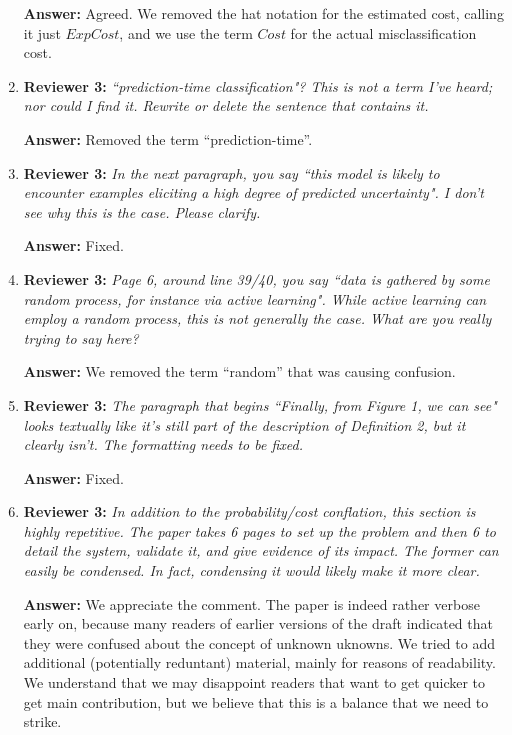\documentclass[letterpaper]{article}
\begin{document}
\begin{enumerate}
\textbf{Answer:} Agreed. We removed the hat notation for the estimated cost, calling it just $\mathit{ExpCost}$, and we use the term $\mathit{Cost}$ for the actual misclassification cost.

\item \textbf{Reviewer 3:} \emph{ ``prediction-time classification"?  This is not a term I've heard; nor could I find it.  Rewrite or delete the sentence that contains it.}

\textbf{Answer:} Removed the term ``prediction-time''.

\item \textbf{Reviewer 3:} \emph{ In the next paragraph, you say ``this model is likely to encounter examples eliciting a high degree of predicted uncertainty".  I don't see why this is the case.  Please clarify.}

\textbf{Answer:} Fixed.

\item \textbf{Reviewer 3:} \emph{ Page 6, around line 39/40, you say ``data is gathered by some random process, for instance via active learning".  While active learning can employ a random process, this is not generally the case.  What are you really trying to say here?}

\textbf{Answer:} We removed the term ``random'' that was causing confusion.

\item \textbf{Reviewer 3:} \emph{ The paragraph that begins ``Finally, from Figure 1, we can see" looks textually like it's still part of the description of Definition 2, but it clearly isn't. The formatting needs to be fixed.}

\textbf{Answer:} Fixed.

\item \textbf{Reviewer 3:} \emph{ In addition to the probability/cost conflation, this section is highly repetitive.  The paper takes 6 pages to set up the problem and then 6 to detail the system, validate it, and give evidence of its impact.  The former can easily be condensed.  In fact, condensing it would likely make it more clear.}

\textbf{Answer:} We appreciate the comment. The paper is indeed rather verbose early on, because many readers of earlier versions of the draft indicated that they were confused about the concept of unknown uknowns. We tried to add additional (potentially reduntant) material, mainly for reasons of readability. We understand that we may disappoint readers that want to get quicker to get main contribution, but we believe that this is a balance that we need to strike.


\end{enumerate}
\end{document}
